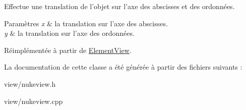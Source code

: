 Effectue une translation de l’objet sur l’axe des abscisses et des ordonnées. 


\begin{DoxyParams}{Paramètres}
{\em x} & la translation sur l’axe des abscisses. \\
\hline
{\em y} & la translation sur l’axe des ordonnées. \\
\hline
\end{DoxyParams}


Réimplémentée à partir de \hyperlink{classElementView_a69a525cb674a36e33be6a8b7a6e4b83c}{Element\+View}.



La documentation de cette classe a été générée à partir des fichiers suivants \+:\begin{DoxyCompactItemize}
\item 
view/nukeview.\+h\item 
view/nukeview.\+cpp\end{DoxyCompactItemize}
